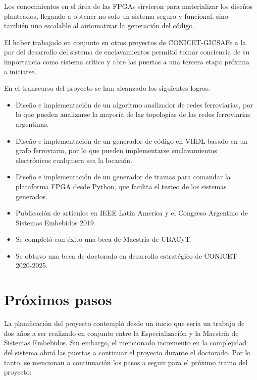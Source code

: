 	Los conocimientos en el área de las FPGAs sirvieron para materializar los diseños planteados, llegando a obtener no solo un sistema seguro y funcional, sino también uno escalable al automatizar la generación del código.
	
	El haber trabajado en conjunto en otros proyectos de CONICET-GICSAFe a la par del desarrollo del sistema de enclavamientos permitió tomar conciencia de su importancia como sistema crítico y abre las puertas a una tercera etapa próxima a iniciarse. %

	En el transcurso del proyecto se han alcanzado los siguientes logros:
	
	\begin{itemize}
		\item Diseño e implementación de un algoritmo analizador de redes ferroviarias, por lo que pueden analizarse la mayoría de las topologías de las redes ferroviarias argentinas.
		\item Diseño e implementación de un generador de código en VHDL basado en un grafo ferroviario, por lo que pueden implementarse enclavamientos electrónicos cualquiera sea la locación.
		\item Diseño e implementación de un generador de tramas para comandar la plataforma FPGA desde Python, que facilita el testeo de los sistemas generados.
		\item Publicación de artículos en IEEE Latin America y el Congreso Argentino de Sistemas Embebidos 2019\cite{IEEE_LAT}.
		\item Se completó con éxito una beca de Maestría de UBACyT.
		\item Se obtuvo una beca de doctorado en desarrollo estratégico de CONICET 2020-2025.
	\end{itemize}
	
\section{Próximos pasos}

	La planificación del proyecto contempló desde un inicio que sería un trabajo de dos años a ser realizado en conjunto entre la Especialización y la Maestría de Sistemas Embebidos. Sin embargo, el mencionado incremento en la complejidad del sistema abrió las puertas a continuar el proyecto durante el doctorado. Por lo tanto, se mencionan a continuación los pasos a seguir para el próximo tramo del proyecto:	
	
